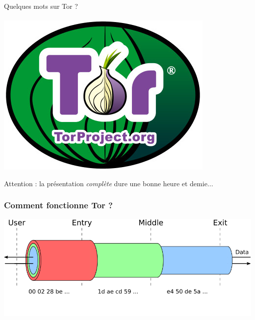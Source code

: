 \documentclass{beamer}
\begin{document}
\begin{frame}
\begin{center}
\Huge{Quelques mots sur Tor ? }
\\~\\ \includegraphics[scale=0.4]{./images/logo_tor.jpg}
\end{center}
\huge{Attention : la présentation \emph{complète} dure une bonne heure et demie...}
\end{frame}

\begin{frame}
\frametitle{Comment fonctionne Tor ?}
\begin{center}
\includegraphics[keepaspectratio,width=\textwidth, height=.8\textheight]{images/tor-keys1}
\end{center}
\end{frame}
\end{document}
